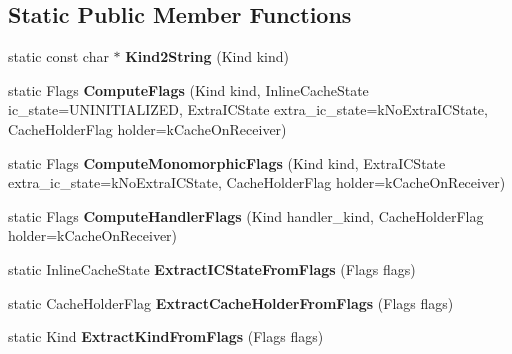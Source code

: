 \subsection*{Static Public Member Functions}
\begin{DoxyCompactItemize}
\item 
static const char $\ast$ {\bfseries Kind2\+String} (Kind kind)\hypertarget{classv8_1_1internal_1_1_code_a4f341eb1728094338978e676ba787bac}{}\label{classv8_1_1internal_1_1_code_a4f341eb1728094338978e676ba787bac}

\item 
static Flags {\bfseries Compute\+Flags} (Kind kind, Inline\+Cache\+State ic\+\_\+state=U\+N\+I\+N\+I\+T\+I\+A\+L\+I\+Z\+ED, Extra\+I\+C\+State extra\+\_\+ic\+\_\+state=k\+No\+Extra\+I\+C\+State, Cache\+Holder\+Flag holder=k\+Cache\+On\+Receiver)\hypertarget{classv8_1_1internal_1_1_code_ae29db6f864b797d958283f244341bb16}{}\label{classv8_1_1internal_1_1_code_ae29db6f864b797d958283f244341bb16}

\item 
static Flags {\bfseries Compute\+Monomorphic\+Flags} (Kind kind, Extra\+I\+C\+State extra\+\_\+ic\+\_\+state=k\+No\+Extra\+I\+C\+State, Cache\+Holder\+Flag holder=k\+Cache\+On\+Receiver)\hypertarget{classv8_1_1internal_1_1_code_a357612e96f46c3a79451c616e3ea3a4c}{}\label{classv8_1_1internal_1_1_code_a357612e96f46c3a79451c616e3ea3a4c}

\item 
static Flags {\bfseries Compute\+Handler\+Flags} (Kind handler\+\_\+kind, Cache\+Holder\+Flag holder=k\+Cache\+On\+Receiver)\hypertarget{classv8_1_1internal_1_1_code_ab21c9835048519301e9c7d435225b7cd}{}\label{classv8_1_1internal_1_1_code_ab21c9835048519301e9c7d435225b7cd}

\item 
static Inline\+Cache\+State {\bfseries Extract\+I\+C\+State\+From\+Flags} (Flags flags)\hypertarget{classv8_1_1internal_1_1_code_a9f3e7c286012b8719d4a105c35a22a5e}{}\label{classv8_1_1internal_1_1_code_a9f3e7c286012b8719d4a105c35a22a5e}

\item 
static Cache\+Holder\+Flag {\bfseries Extract\+Cache\+Holder\+From\+Flags} (Flags flags)\hypertarget{classv8_1_1internal_1_1_code_ac2f8f96d02753c6c2a84afd8fe8c2639}{}\label{classv8_1_1internal_1_1_code_ac2f8f96d02753c6c2a84afd8fe8c2639}

\item 
static Kind {\bfseries Extract\+Kind\+From\+Flags} (Flags flags)\hypertarget{classv8_1_1internal_1_1_code_aa0ad62b9d5593fe9ae36d9952cfe812a}{}\label{classv8_1_1internal_1_1_code_aa0ad62b9d5593fe9ae36d9952cfe812a}


\end{DoxyCompactItemize}
